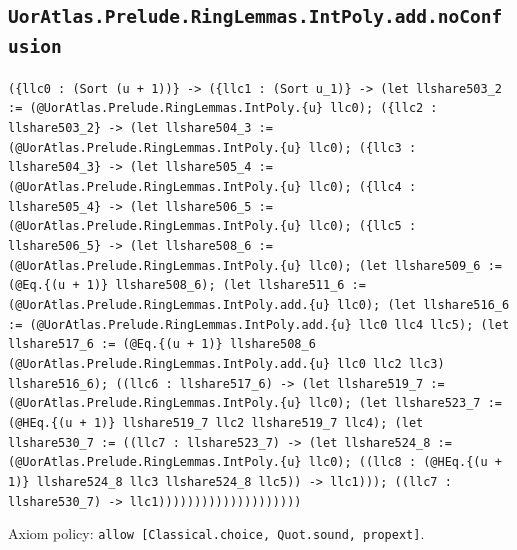 \documentclass[11pt]{article}
\begin{document}
\subsection*{\texttt{UorAtlas.Prelude.RingLemmas.IntPoly.add.noConfusion}}
\noindent\texttt{(\{llc0 : (Sort (u + 1))\} -> (\{llc1 : (Sort u\_1)\} -> (let llshare503\_2 := (@UorAtlas.Prelude.RingLemmas.IntPoly.\{u\} llc0); (\{llc2 : llshare503\_2\} -> (let llshare504\_3 := (@UorAtlas.Prelude.RingLemmas.IntPoly.\{u\} llc0); (\{llc3 : llshare504\_3\} -> (let llshare505\_4 := (@UorAtlas.Prelude.RingLemmas.IntPoly.\{u\} llc0); (\{llc4 : llshare505\_4\} -> (let llshare506\_5 := (@UorAtlas.Prelude.RingLemmas.IntPoly.\{u\} llc0); (\{llc5 : llshare506\_5\} -> (let llshare508\_6 := (@UorAtlas.Prelude.RingLemmas.IntPoly.\{u\} llc0); (let llshare509\_6 := (@Eq.\{(u + 1)\} llshare508\_6); (let llshare511\_6 := (@UorAtlas.Prelude.RingLemmas.IntPoly.add.\{u\} llc0); (let llshare516\_6 := (@UorAtlas.Prelude.RingLemmas.IntPoly.add.\{u\} llc0 llc4 llc5); (let llshare517\_6 := (@Eq.\{(u + 1)\} llshare508\_6 (@UorAtlas.Prelude.RingLemmas.IntPoly.add.\{u\} llc0 llc2 llc3) llshare516\_6); ((llc6 : llshare517\_6) -> (let llshare519\_7 := (@UorAtlas.Prelude.RingLemmas.IntPoly.\{u\} llc0); (let llshare523\_7 := (@HEq.\{(u + 1)\} llshare519\_7 llc2 llshare519\_7 llc4); (let llshare530\_7 := ((llc7 : llshare523\_7) -> (let llshare524\_8 := (@UorAtlas.Prelude.RingLemmas.IntPoly.\{u\} llc0); ((llc8 : (@HEq.\{(u + 1)\} llshare524\_8 llc3 llshare524\_8 llc5)) -> llc1))); ((llc7 : llshare530\_7) -> llc1))))))))))))))))))))}\par
\noindent Axiom policy: \texttt{allow [Classical.choice, Quot.sound, propext]}.\par
\end{document}

